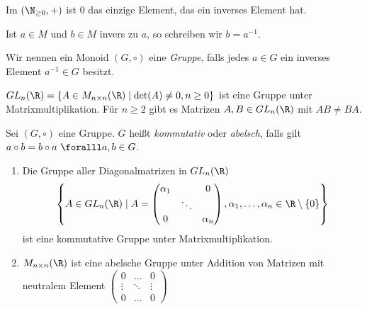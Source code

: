 \begin{exmp*}
	Im $ (\N_{\geq 0},+) $ ist 0 das einzige Element, das ein inverses Element hat.
\end{exmp*}

\begin{notat*}
	Ist $ a \in M $ und $ b \in M $ invers zu $a$, so schreiben wir $ b = a^{-1} $.
\end{notat*}

\begin{defn*}[Gruppe]
	Wir nennen ein Monoid $ (G,\circ) $ eine \emph{Gruppe}, falls jedes $ a \in G $ ein inverses Element $ a^{-1} \in G $ besitzt.
\end{defn*}

\begin{exmp*}
	$ GL_n(\R) = \{A \in M_{n \times n} (\R) \mid \det(A) \neq 0, n \geq 0\} $ ist eine Gruppe unter Matrixmultiplikation. Für $ n \geq 2 $ gibt es Matrizen $ A,B \in GL_n(\R) $ mit $ AB \neq BA $.
\end{exmp*}

\begin{defn*}
	Sei $ (G,\circ) $ eine Gruppe. $G$ heißt \emph{kommutativ} oder \emph{abelsch}, falls gilt $ a \circ b = b \circ a \ \foralll a,b \in G $.
\end{defn*}

\begin{exmp*}
	\begin{enumerate}[label=\textcircled{\alph*}]
		\item Die Gruppe aller Diagonalmatrizen in $ GL_n(\R) $ 
			$$ \left\{A \in GL_n(\R) \mid A = \begin{pmatrix}
				\alpha_1 & & 0 \\ & \ddots & \\ 0 & & \alpha_n
			\end{pmatrix}, \alpha_1, \dotsc, \alpha_n \in \R \setminus\{0\} \right\} $$
			ist eine kommutative Gruppe unter Matrixmultiplikation.
		\item $ M_{n \times n}(\R) $ ist eine abelsche Gruppe unter Addition von Matrizen mit neutralem Element $ \begin{pmatrix}
			0 & \dots & 0 \\ \vdots & \ddots & \vdots \\ 0 & \dots & 0
		\end{pmatrix} $
	\end{enumerate}
\end{exmp*}

